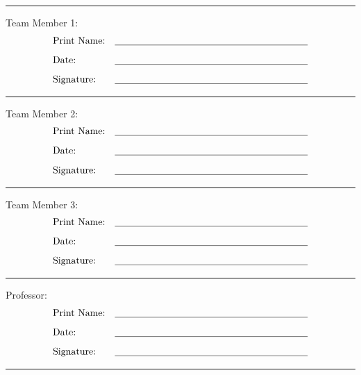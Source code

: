 \documentclass[11pt, letterpaper, notitlepage]{Article}
\begin{document}
\vspace{1em}\hrule\vspace{1em}

Team Member 1:
\begin{align*}
&\text{Print Name:} &\text{\underline{\hspace{7cm}}}\\[0.5em]
&\text{Date:} &\text{\underline{\hspace{7cm}}}\\[0.5em]
&\text{Signature:} &\text{\underline{\hspace{7cm}}}
\end{align*}

\vspace{1em}\hrule\vspace{1em}

\noindent
Team Member 2:
\begin{align*}
&\text{Print Name:} &\text{\underline{\hspace{7cm}}}\\[0.5em]
&\text{Date:} &\text{\underline{\hspace{7cm}}}\\[0.5em]
&\text{Signature:} &\text{\underline{\hspace{7cm}}}
\end{align*}

\vspace{1em}\hrule\vspace{1em}

\noindent
Team Member 3:
\begin{align*}
&\text{Print Name:} &\text{\underline{\hspace{7cm}}}\\[0.5em]
&\text{Date:} &\text{\underline{\hspace{7cm}}}\\[0.5em]
&\text{Signature:} &\text{\underline{\hspace{7cm}}}
\end{align*}

\vspace{1em}\hrule\vspace{1em}

\noindent
Professor:
\begin{align*}
&\text{Print Name:} &\text{\underline{\hspace{7cm}}}\\[0.5em]
&\text{Date:} &\text{\underline{\hspace{7cm}}}\\[0.5em]
&\text{Signature:} &\text{\underline{\hspace{7cm}}}
\end{align*}

\vspace{1em}\hrule\vspace{1em}
\end{document}

